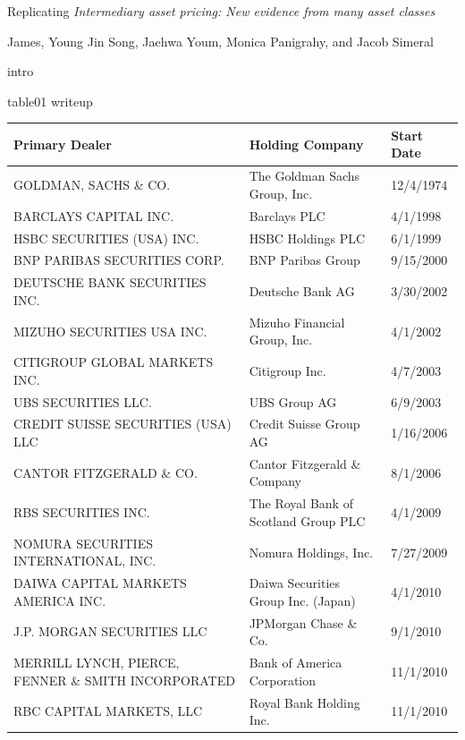 \documentclass{article}
\begin{document}
{
\fontsize{14}{16}\selectfont
\textnormal{Replicating} \textit{Intermediary asset pricing: New evidence from many asset classes}
}

\bigskip

{
\fontsize{12}{14}\selectfont
James, Young Jin Song, Jaehwa Youm, Monica Panigrahy, and Jacob Simeral
}
\par
intro\par

\par
table01 writeup\par

\begin{adjustbox}{max width=\textwidth}
\begin{tabular}{lll}
\toprule
Primary Dealer & Holding Company & Start Date \\
\midrule
GOLDMAN, SACHS \& CO.                & The Goldman Sachs Group, Inc. & 12/4/1974 \\
BARCLAYS CAPITAL INC.               & Barclays PLC & 4/1/1998 \\
HSBC SECURITIES (USA) INC.          & HSBC Holdings PLC & 6/1/1999 \\
BNP PARIBAS SECURITIES CORP.     & BNP Paribas Group & 9/15/2000 \\
DEUTSCHE BANK SECURITIES INC.    & Deutsche Bank AG & 3/30/2002 \\
MIZUHO SECURITIES USA INC.       & Mizuho Financial Group, Inc. & 4/1/2002 \\
CITIGROUP GLOBAL MARKETS INC.    & Citigroup Inc. & 4/7/2003 \\
UBS SECURITIES LLC.                 & UBS Group AG & 6/9/2003 \\
CREDIT SUISSE SECURITIES (USA) LLC     & Credit Suisse Group AG & 1/16/2006 \\
CANTOR FITZGERALD \& CO. & Cantor Fitzgerald \& Company & 8/1/2006 \\
RBS SECURITIES INC. & The Royal Bank of Scotland Group PLC & 4/1/2009 \\
NOMURA SECURITIES INTERNATIONAL, INC. & Nomura Holdings, Inc. & 7/27/2009 \\
DAIWA CAPITAL MARKETS AMERICA INC.   & Daiwa Securities Group Inc. (Japan) & 4/1/2010 \\
J.P. MORGAN SECURITIES LLC         & JPMorgan Chase \& Co. & 9/1/2010 \\
MERRILL LYNCH, PIERCE, FENNER \& SMITH INCORPORATED & Bank of America Corporation & 11/1/2010 \\
RBC CAPITAL MARKETS, LLC & Royal Bank Holding Inc. & 11/1/2010 \\

\end{tabular}
\end{adjustbox}
\end{document}
